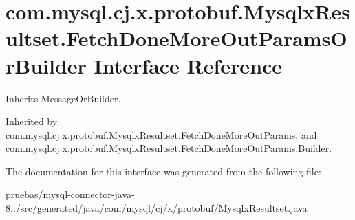 \hypertarget{interfacecom_1_1mysql_1_1cj_1_1x_1_1protobuf_1_1_mysqlx_resultset_1_1_fetch_done_more_out_params_or_builder}{}\section{com.\+mysql.\+cj.\+x.\+protobuf.\+Mysqlx\+Resultset.\+Fetch\+Done\+More\+Out\+Params\+Or\+Builder Interface Reference}
\label{interfacecom_1_1mysql_1_1cj_1_1x_1_1protobuf_1_1_mysqlx_resultset_1_1_fetch_done_more_out_params_or_builder}


Inherits Message\+Or\+Builder.



Inherited by com.\+mysql.\+cj.\+x.\+protobuf.\+Mysqlx\+Resultset.\+Fetch\+Done\+More\+Out\+Params, and com.\+mysql.\+cj.\+x.\+protobuf.\+Mysqlx\+Resultset.\+Fetch\+Done\+More\+Out\+Params.\+Builder.



The documentation for this interface was generated from the following file\+:\begin{DoxyCompactItemize}
\item 
pruebas/mysql-\/connector-\/java-\/8../src/generated/java/com/mysql/cj/x/protobuf/Mysqlx\+Resultset.\+java\end{DoxyCompactItemize}
